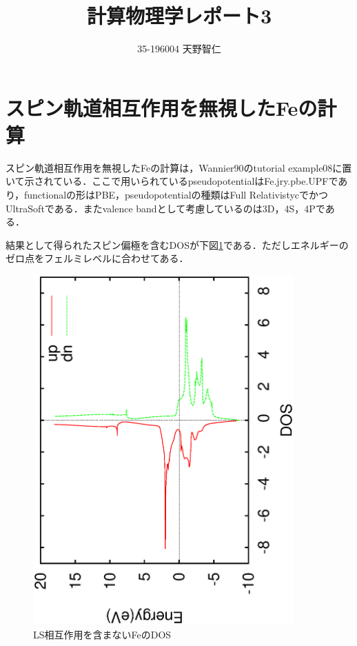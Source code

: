 \documentclass[a4j]{jarticle}
\title{計算物理学レポート3}
\author{35-196004 天野智仁}
\date{}
\begin{document}
\section{スピン軌道相互作用を無視したFeの計算}
スピン軌道相互作用を無視したFeの計算は，Wannier90のtutorial example08に置いて示されている．ここで用いられているpseudopotentialはFe.jry.pbe.UPFであり，functionalの形はPBE，pseudopotentialの種類はFull RelativistycでかつUltraSoftである．またvalence bandとして考慮しているのは3D，4S，4Pである．

結果として得られたスピン偏極を含むDOSが下図\ref{120041_4Jul19}である．ただしエネルギーのゼロ点をフェルミレベルに合わせてある．
\begin{figure}[htb]
\centering
 \includegraphics[width=10cm,angle=270]{dos.eps}
\caption{LS相互作用を含まないFeのDOS}
\label{120041_4Jul19}
\end{figure}
\end{document}
